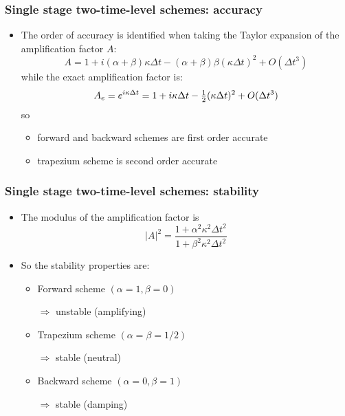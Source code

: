 \documentclass[aspectratio=43,9pt]{beamer}
\begin{document}
\begin{frame}
	\frametitle{Single stage two-time-level schemes: accuracy}
	\begin{itemize}
		\item The order of accuracy is identified when taking the Taylor expansion of the amplification factor $A$:
			\begin{equation*}
				A = 1+i(\alpha+\beta)\kappa\Delta t-(\alpha+\beta)\beta(\kappa\Delta t)^2+O(\Delta t^3)
			\end{equation*}
			while the exact amplification factor is:
			\begin{equation*}
				A_e=e^{i\kappa\Delta t}=1+i\kappa\Delta t-{\textstyle\frac{1}{2}}(\kappa\Delta t)^2+O(\Delta t^3)
			\end{equation*}
			so\vspace*{1ex}
			\begin{itemize}
				\item forward and backward schemes are first order accurate\vspace*{1ex}
				\item trapezium scheme is second order accurate
			\end{itemize}
	\end{itemize}
\end{frame}
%
%
%
\begin{frame}
	\frametitle{Single stage two-time-level schemes: stability}
	\begin{itemize}
		\item The modulus of the amplification factor is
			\begin{equation*}
				|A|^2 = \frac{1 + \alpha^2 \kappa^2 \Delta t^2}{1 + \beta^2 \kappa^2 \Delta t^2}
			\end{equation*}
		\item So the stability properties are:\vspace*{1ex}
			\begin{itemize}
				\item \parbox{5cm}{Forward scheme $(\alpha=1, \beta=0)$} $\Rightarrow$ unstable (amplifying)\vspace*{1ex}
				\item \parbox{5cm}{Trapezium scheme $(\alpha=\beta=1/2)$} $\Rightarrow$ stable (neutral)\vspace*{1ex}
				\item \parbox{5cm}{Backward scheme $(\alpha=0, \beta=1)$} $\Rightarrow$ stable (damping)
			\end{itemize}
	\end{itemize}
\end{frame}
\end{document}
